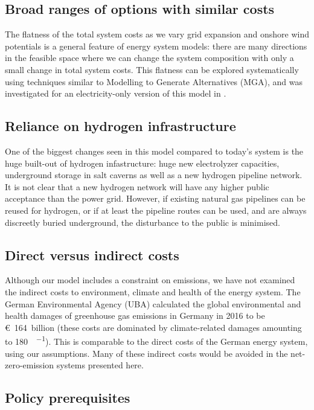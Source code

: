 \subsection*{Broad ranges of options with similar costs}

The flatness of the total system costs as we vary grid expansion and
onshore wind potentials is a general feature of energy system models:
there are many directions in the feasible space where we can change
the system composition with only a small change in total system
costs. This flatness can be explored systematically using techniques similar to Modelling to
Generate Alternatives (MGA), and was investigated for an
electricity-only version of this model in \cite{Neumann2019}.

\subsection*{Reliance on hydrogen infrastructure}

One of the biggest changes seen in this model compared to today's
system is the huge built-out of hydrogen infastructure: huge new
electrolyzer capacities, underground storage in salt caverns as well
as a new hydrogen pipeline network. It is not clear that a new
hydrogen network will have any higher public acceptance than the power
grid. However, if existing natural gas pipelines can be reused for hydrogen,
or if at least the pipeline routes can be used, and are always discreetly buried underground, the disturbance to
the public is minimised.


\subsection*{Direct versus indirect costs}

Although our model includes a constraint on \co emissions, we have
not examined the indirect costs to environment, climate and health of
the energy system. The German Environmental Agency (UBA) calculated
the global environmental and health damages of greenhouse gas
emissions in Germany in 2016 to be \euro~164~billion \cite{UBA2019}
(these costs are dominated by climate-related damages amounting to
\SI{180}{\sieuro\per\tco}). This is comparable to the direct costs of the
German energy system, using our assumptions. Many of these indirect
costs would be avoided in the net-zero-emission systems presented
here.


\subsection*{Policy prerequisites}

